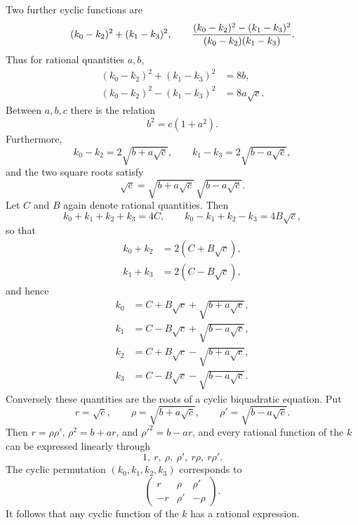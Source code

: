 \documentclass[11pt]{article}
\begin{document}
Two further cyclic functions are
\[
  (k_0-k_2)^2+(k_1-k_3)^2,
  \qquad
  { (k_0-k_2)^2-(k_1-k_3)^2\over (k_0-k_2)(k_1-k_3)}.
\]
Thus for rational quantities $a,b$,
\begin{equation}\tag{3}
\begin{aligned}
  (k_0-k_2)^2+(k_1-k_3)^2 &= 8b,\\
  (k_0-k_2)^2-(k_1-k_3)^2 &= 8a\sqrt c.
\end{aligned}
\end{equation}
Between $a,b,c$ there is the relation
\begin{equation}\tag{4}
  b^2=c(1+a^2).
\end{equation}
Furthermore,
\begin{equation}\tag{5}
  k_0-k_2=2\sqrt{b+a\sqrt c},\qquad
  k_1-k_3=2\sqrt{b-a\sqrt c},
\end{equation}
and the two square roots satisfy
\begin{equation}\tag{6}
  \sqrt c=\sqrt{b+a\sqrt c}\,\sqrt{b-a\sqrt c}.
\end{equation}
Let $C$ and $B$ again denote rational quantities. Then
\begin{equation}\tag{7}
  k_0+k_1+k_2+k_3=4C,
  \qquad
  k_0-k_1+k_2-k_3=4B\sqrt c,
\end{equation}
so that
\begin{equation}\tag{8}
\begin{aligned}
  k_0+k_2&=2(C+B\sqrt c),\\
  k_1+k_3&=2(C-B\sqrt c),
\end{aligned}
\end{equation}
and hence
\begin{equation}\tag{9}
\begin{aligned}
 k_0&=C+B\sqrt c+\sqrt{b+a\sqrt c},\\
 k_1&=C-B\sqrt c+\sqrt{b-a\sqrt c},\\
 k_2&=C+B\sqrt c-\sqrt{b+a\sqrt c},\\
 k_3&=C-B\sqrt c-\sqrt{b-a\sqrt c}.
\end{aligned}
\end{equation}
Conversely these quantities are the roots of a cyclic biquadratic equation. Put
\begin{equation}\tag{10}
  r=\sqrt c,
  \qquad \rho=\sqrt{b+a\sqrt c},
  \qquad \rho'=\sqrt{b-a\sqrt c}.
\end{equation}
Then $r=\rho\rho'$, $\rho^2=b+ar$, and $\rho'^2=b-ar$, and every rational function of the $k$ can be expressed linearly through
\[
  1,\ r,\ \rho,\ \rho',\ r\rho,\ r\rho'.
\]
The cyclic permutation $(k_0,k_1,k_2,k_3)$ corresponds to
\[
  \begin{pmatrix} r&\rho&\rho'\\ -r&\rho'&-\rho\end{pmatrix}.
\]
It follows that any cyclic function of the $k$ has a rational expression.
\end{document}
